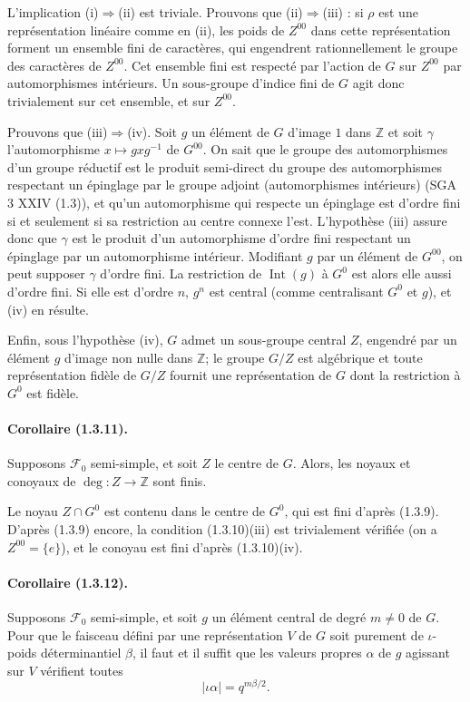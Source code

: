 \documentclass[11pt]{article}
\theoremstyle{remark}
\newcommand{\ZZ}{\mathbb{Z}}
\begin{document}
L'implication (i)$\Rightarrow$(ii) est triviale. Prouvons que (ii)$\Rightarrow$(iii) : si $\rho$ est une représentation linéaire comme en (ii), les poids de $Z^{00}$ dans cette représentation forment un ensemble fini de caractères, qui engendrent rationnellement le groupe des caractères de $Z^{00}$. Cet ensemble fini est respecté par l'action de $G$ sur $Z^{00}$ par automorphismes intérieurs. Un sous-groupe d'indice fini de $G$ agit donc trivialement sur cet ensemble, et sur $Z^{00}$.

Prouvons que (iii)$\Rightarrow$(iv). Soit $g$ un élément de $G$ d'image $1$ dans $\ZZ$ et soit $\gamma$ l'automorphisme $x\mapsto gxg^{-1}$ de $G^{00}$. On sait que le groupe des automorphismes d'un groupe réductif est le produit semi-direct du groupe des automorphismes respectant un épinglage par le groupe adjoint (automorphismes intérieurs) (SGA 3 XXIV (1.3)), et qu'un automorphisme qui respecte un épinglage est d'ordre fini si et seulement si sa restriction au centre connexe l'est. L'hypothèse (iii) assure donc que $\gamma$ est le produit d'un automorphisme d'ordre fini respectant un épinglage par un automorphisme intérieur. Modifiant $g$ par un élément de $G^{00}$, on peut supposer $\gamma$ d'ordre fini. La restriction de $\operatorname{Int}(g)$ à $G^0$ est alors elle aussi d'ordre fini. Si elle est d'ordre $n$, $g^n$ est central (comme centralisant $G^0$ et $g$), et (iv) en résulte.

Enfin, sous l'hypothèse (iv), $G$ admet un sous-groupe central $Z$, engendré par un élément $g$ d'image non nulle dans $\ZZ$; le groupe $G/Z$ est algébrique et toute représentation fidèle de $G/Z$ fournit une représentation de $G$ dont la restriction à $G^0$ est fidèle.

\paragraph{Corollaire (1.3.11).} Supposons $\mathcal F_0$ semi-simple, et soit $Z$ le centre de $G$. Alors, les noyaux et conoyaux de $\deg:Z\to\ZZ$ sont finis.

Le noyau $Z\cap G^0$ est contenu dans le centre de $G^0$, qui est fini d'après (1.3.9). D'après (1.3.9) encore, la condition (1.3.10)(iii) est trivialement vérifiée (on a $Z^{00}=\{e\}$), et le conoyau est fini d'après (1.3.10)(iv).

\paragraph{Corollaire (1.3.12).} Supposons $\mathcal F_0$ semi-simple, et soit $g$ un élément central de degré $m\ne0$ de $G$. Pour que le faisceau défini par une représentation $V$ de $G$ soit purement de $\iota$-poids déterminantiel $\beta$, il faut et il suffit que les valeurs propres $\alpha$ de $g$ agissant sur $V$ vérifient toutes
\[
|\iota\alpha|=q^{m\beta/2}.
\]
\end{document}
